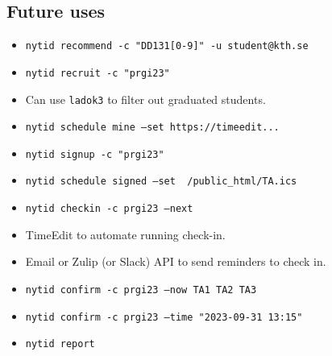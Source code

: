 \subsection{Future uses}

\begin{frame}[fragile]
  \begin{example}[TA pool]
    \begin{itemize}
      \item \texttt{nytid recommend -c "DD131[0-9]" -u student@kth.se}
      \item \texttt{nytid recruit -c "prgi23"}
      \item Can use \texttt{ladok3} to filter out graduated students.
    \end{itemize}
  \end{example}
  
  \pause

  \begin{example}[TA sign up]
    \begin{itemize}
      \item \texttt{nytid schedule mine --set  https://timeedit...}
      \item \texttt{nytid signup -c "prgi23"}
      \item \texttt{nytid schedule signed --set ~/public_html/TA.ics}
    \end{itemize}
  \end{example}
\end{frame}

\begin{frame}[fragile]
  \begin{example}[TA confirmation]
    \begin{itemize}
      \item \texttt{nytid checkin -c prgi23 --next }
      \item TimeEdit to automate running check-in.
      \item Email or Zulip (or Slack) API to send reminders to check in.
      \item \texttt{nytid confirm -c prgi23 --now TA1 TA2 TA3}
      \item \texttt{nytid confirm -c prgi23 --time "2023-09-31 13:15"}
    \end{itemize}
  \end{example}

  \pause

  \begin{example}
    \begin{itemize}
      \item \texttt{nytid report}
    \end{itemize}
  \end{example}
\end{frame}

